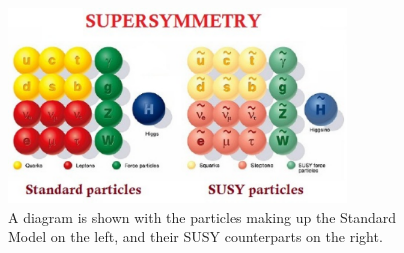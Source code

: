 \begin{figure}[!htb]
  \begin{center}
    \includegraphics[width=0.8\textwidth]{intro/figs/Susy-particles.pdf}
    \caption{
      \label{fig:SM_SUSY}
      A diagram is shown with the particles making up the Standard Model on the left, and their SUSY counterparts on the right.
    }
  \end{center}
\end{figure}



